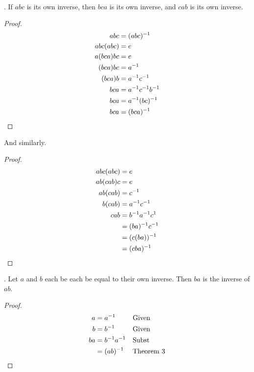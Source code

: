 \documentclass[twoside]{amsart}
\begin{document}
\begin{enumerate}[A.]
   . If $abc$ is its own inverse, then $bca$ is its own inverse,
   and $cab$ is its own inverse.
   \begin{proof}
      \begin{align*}
         abc & = (abc)^{-1}     \\
	 abc(abc) & = e  \\
	 a(bca)bc & = e  \\
	 (bca)bc & = a^{-1} \\
	 (bca)b  & = a^{-1}c^{-1} \\
	 bca     & = a^{-1}c^{-1}b^{-1} \\
	 bca     & = a^{-1}(bc)^{-1} \\
	 bca     & = (bca)^{-1} \qedhere
      \end{align*}
   \end{proof}
   And similarly.
   \begin{proof}
      \begin{align*}
         abc(abc) & = e \\
	 ab(cab)c & = e \\
	 ab(cab)  & = c^{-1} \\
	 b(cab)   & = a^{-1}c^{-1} \\
	 cab      & = b^{-1}a^{-1}c^{1} \\
	          & = (ba)^{-1}c^{-1}   \\
		  & = (c(ba))^{-1} \\
		  & = (cba) ^{-1} \qedhere
      \end{align*}
   \end{proof}

   . Let $a$ and $b$ each be each be equal to their own inverse.
   Then $ba$ is the inverse of $ab$.
   \begin{proof}
      \begin{align*}
        a & = a^{-1}       && \text{Given} \\
	b & = b^{-1}       && \text{Given} \\
        ba & = b^{-1}a^{-1}  && \text{Subst} \\
           & = (ab)^{-1} && \text{Theorem 3}  \qedhere
      \end{align*}
   \end{proof}

\end{enumerate}
\end{document}
